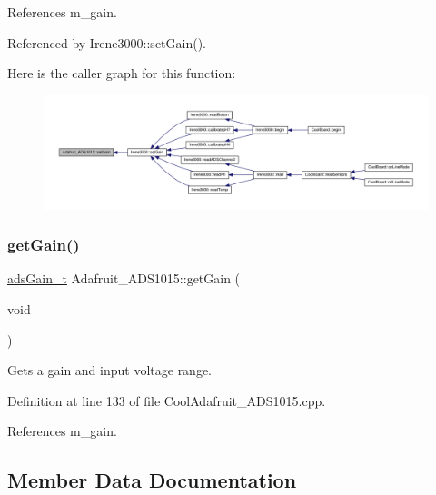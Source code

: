 References m\+\_\+gain.



Referenced by Irene3000\+::set\+Gain().

Here is the caller graph for this function\+:
\nopagebreak
\begin{figure}[H]
\begin{center}
\leavevmode
\includegraphics[width=350pt]{df/df6/class_adafruit___a_d_s1015_a399441eace686975ff22937cbe45cc50_icgraph}
\end{center}
\end{figure}
\mbox{\label{class_adafruit___a_d_s1015_a6232d089aaa82226bc34623fdf92237c}} 
\subsubsection{\texorpdfstring{get\+Gain()}{getGain()}}
{\footnotesize\ttfamily \hyperlink{_cool_adafruit___a_d_s1015_8h_a3d6c0e15829a207b9155890811fa4781}{ads\+Gain\+\_\+t} Adafruit\+\_\+\+A\+D\+S1015\+::get\+Gain (\begin{DoxyParamCaption}\item[{void}]{ }\end{DoxyParamCaption})}



Gets a gain and input voltage range. 



Definition at line 133 of file Cool\+Adafruit\+\_\+\+A\+D\+S1015.\+cpp.



References m\+\_\+gain.



\subsection{Member Data Documentation}
\mbox{\label{class_adafruit___a_d_s1015_a2186993621a7973256d47f086c74035d}} 
